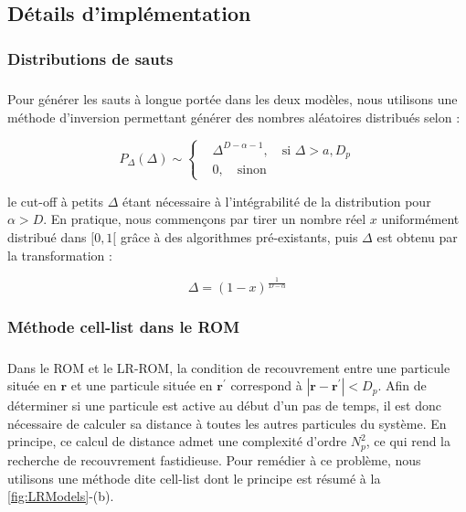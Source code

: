 \subsection{Détails d'implémentation}

\label{sec:DetImpl}

\subsubsection{Distributions de sauts}

\subparagraph{}Pour générer les sauts à longue portée dans les deux modèles, nous utilisons une méthode d'inversion \cite{devroye_general_1986} permettant générer des nombres aléatoires distribués selon :

\begin{equation}
	P_\Delta(\Delta) \sim \left\{
	\begin{aligned}
	& \Delta^{D-\alpha-1},\quad \text{si } \Delta > a, D_p\\
	& 0, \quad \text{sinon}
	\end{aligned}\right.
\end{equation}

\noindent le cut-off à petits $\Delta$ étant nécessaire à l'intégrabilité de la distribution pour $\alpha > D$. En pratique, nous commençons par tirer un nombre réel $x$ uniformément distribué dans $[0,1[$ grâce à des algorithmes pré-existants, puis $\Delta$ est obtenu par la transformation :

\begin{equation}
	\Delta = (1-x)^\frac{1}{D-\alpha}
\end{equation}

\subsubsection{Méthode cell-list dans le ROM}

\subparagraph{}Dans le ROM et le LR-ROM, la condition de recouvrement entre une particule située en $\mathbf{r}$ et une particule située en $\mathbf{r}^\prime$ correspond à $|\mathbf{r}-\mathbf{r}^\prime|<D_p$. Afin de déterminer si une particule est active au début d'un pas de temps, il est donc nécessaire de calculer sa distance à toutes les autres particules du système. En principe, ce calcul de distance admet une complexité d'ordre $N_p^2$, ce qui rend la recherche de recouvrement fastidieuse. Pour remédier à ce problème, nous utilisons une méthode dite cell-list \cite{allen_computer_2017} dont le principe est résumé à la \autoref{fig:LRModels}-(b).

